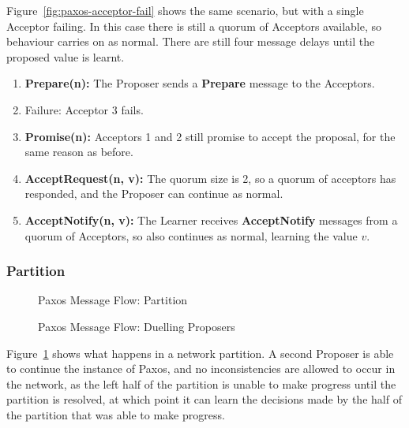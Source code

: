 \documentclass[12pt,twoside,notitlepage]{report}
\newcommand{\lwincludegraphics}[2][]{%
  \sbox{0}{\texttt{[image: \#2]}}%
  \ifdim\wd0>\linewidth
    \resizebox{\linewidth}{!}{\box0 }%
  \else
    \leavevmode\box0
  \fi}
\newcommand{\msg}[1] {{\bf #1}}         %
\begin{document}
Figure~\ref{fig:paxos-acceptor-fail} shows the same
scenario, but with a single Acceptor failing. In this case there is still a quorum of Acceptors
available, so behaviour carries on as normal. There are still four message delays until the
proposed value is learnt.

\begin{enumerate}
\item \msg{Prepare(n):} The Proposer sends a \msg{Prepare} message to the Acceptors.
\item Failure: Acceptor 3 fails.
\item \msg{Promise(n):} Acceptors 1 and 2 still promise to accept the proposal, for the same
	reason as before.
\item \msg{AcceptRequest(n, v):} The quorum size is 2, so a quorum of acceptors has responded, and
	the Proposer can continue as normal.
\item \msg{AcceptNotify(n, v):} The Learner receives \msg{AcceptNotify} messages from a quorum of
	Acceptors, so also continues as normal, learning the value $v$.
\end{enumerate}

\subsubsection*{Partition}

\begin{figure}[h!]
\centering
\lwincludegraphics{figs/paxos-msg-flow-partition.eps}
\caption{\label{fig:paxos-partition}Paxos Message Flow: Partition}
\end{figure}

\begin{figure}[p]
\centering
\lwincludegraphics{figs/paxos-msg-flow-duelling.eps}
\caption{\label{fig:paxos-duelling}Paxos Message Flow: Duelling Proposers}
\end{figure}

Figure~\ref{fig:paxos-partition} shows what happens in a
network partition. A second Proposer is able to continue the instance of Paxos, and no
inconsistencies are allowed to occur in the network, as the left half of the partition is unable
to make progress until the partition is resolved, at which point it can learn the decisions made
by the half of the partition that was able to make progress.
\end{document}
